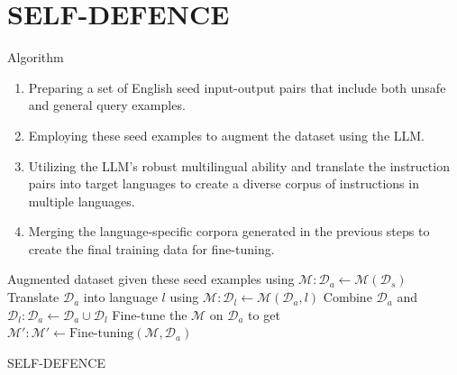 \section{SELF-DEFENCE}

\begin{frame}{Algorithm}
    \begin{enumerate}
        \item Preparing a set of English seed input-output pairs that include both unsafe and general query examples.
        \item Employing these seed examples to augment the dataset using the LLM. 
        \item Utilizing the LLM’s robust multilingual ability and translate the instruction pairs into target languages to create a diverse corpus of instructions in multiple languages.
        \item Merging the language-specific corpora generated in the previous steps to create the final training data for fine-tuning.
    \end{enumerate}
    
    \begin{algorithm}[H]
        \begin{algorithmic}[1]
            \STATE Augmented dataset given these seed examples using $\mathcal{M}: \mathcal{D}_a \leftarrow \mathcal{M}(\mathcal{D}_s)$
                \STATE Translate $\mathcal{D}_a$ into language $l$ using $\mathcal{M}: \mathcal{D}_l \leftarrow \mathcal{M}(\mathcal{D}_a, l)$ 
                \STATE Combine $\mathcal{D}_a$ and $\mathcal{D}_l: \mathcal{D}_a \leftarrow \mathcal{D}_a \cup \mathcal{D}_l$
            \ENDFOR
            \STATE Fine-tune the $\mathcal{M}$ on $\mathcal{D}_a$ to get $\mathcal{M}' : \mathcal{M}' \leftarrow \text{Fine-tuning}(\mathcal{M}, \mathcal{D}_a)$
        \end{algorithmic}
    \caption{SELF-DEFENCE}
    \label{alg:self_defence}
    \end{algorithm}
\end{frame}


